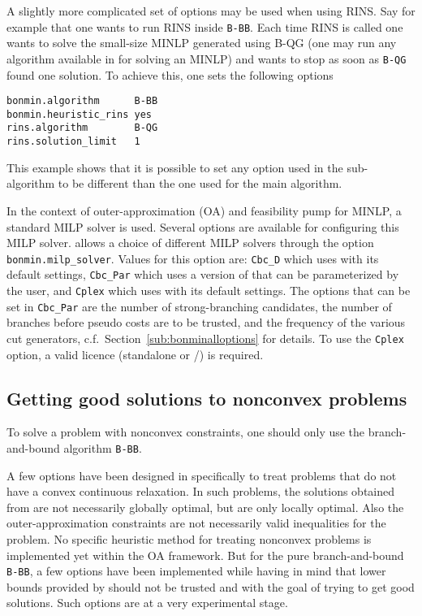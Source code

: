 A slightly more complicated set of options may be used when using RINS.
Say for example that one wants to run RINS inside \texttt{B-BB}.
Each time RINS is called one wants to solve the small-size MINLP generated using B-QG (one may run any algorithm available in \BONMIN for solving an MINLP) and wants to stop as soon as \texttt{B-QG} found one solution.
To achieve this, one sets the following options
\begin{verbatim}
bonmin.algorithm      B-BB
bonmin.heuristic_rins yes
rins.algorithm        B-QG
rins.solution_limit   1
\end{verbatim}
This example shows that it is possible to set any option used in the sub-algorithm to be different than the one used for the main algorithm.

In the context of outer-approximation (OA) and feasibility pump for MINLP, a standard MILP solver is used.
Several options are available for configuring this MILP solver.
\BONMIN allows a choice of different MILP solvers through the option
\texttt{bonmin.milp\_sol\-ver}. Values for this option are: {\tt Cbc\_D} which uses \CBC with its
default settings, {\tt Cbc\_Par} which uses a version of \CBC that can be parameterized by the user, and \texttt{Cplex} which uses \CPLEX with its default settings.
The options that can be set in {\tt Cbc\_Par} are the number of strong-branching candidates,
the number of branches before pseudo costs are to be trusted, and the frequency of the various cut generators, c.f.\ Section~\ref{sub:bonminalloptions} for details.
To use the \texttt{Cplex} option, a valid \CPLEX licence (standalone or \GAMS/\CPLEX) is required.

\subsection{Getting good solutions to nonconvex problems}
To solve a problem with nonconvex constraints, one should only use the branch-and-bound algorithm {\tt B-BB}.

A few options have been designed in \BONMIN specifically to treat
problems that do not have a convex continuous relaxation.
In such problems, the solutions obtained from \IPOPT are
not necessarily globally optimal, but are only locally optimal.
Also the outer-approximation constraints are not necessarily valid inequalities for the problem.
No specific heuristic method for treating nonconvex problems is implemented
yet within the OA framework.
But for the pure branch-and-bound {\tt B-BB}, a few options have been implemented while having
in mind that lower bounds provided by \IPOPT should not be trusted and with the goal of
trying to get good solutions. Such options are at a very experimental stage.

